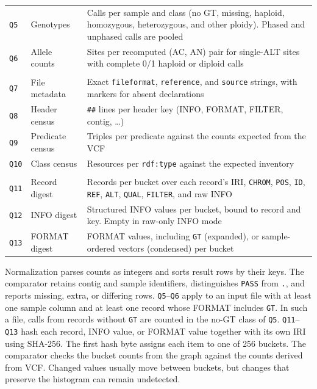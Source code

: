 \documentclass[11pt]{article}
\begin{document}
\begin{table}[!htbp]
\begin{tabularx}{\textwidth}{@{}l l >{\raggedright\arraybackslash}X@{}}
\texttt{Q5} & Genotypes & Calls per sample and class (no GT, missing, haploid, homozygous, heterozygous, and other ploidy).
Phased and unphased calls are pooled\\
\texttt{Q6} & Allele counts & Sites per recomputed (AC, AN) pair for single-ALT sites with complete 0/1 haploid or diploid calls\\
\addlinespace[3pt]
\multicolumn{3}{@{}l}{\textit{Metadata and graph structure}}\\
\texttt{Q7} & File metadata & Exact \texttt{fileformat}, \texttt{reference}, and \texttt{source} strings, with markers for absent declarations\\
\texttt{Q8} & Header census & \texttt{\#\#} lines per header key (INFO, FORMAT, FILTER, contig, \dots)\\
\texttt{Q9} & Predicate census & Triples per predicate against the counts expected from the VCF\\
\texttt{Q10} & Class census & Resources per \texttt{rdf:type} against the expected inventory\\
\addlinespace[3pt]
\multicolumn{3}{@{}l}{\textit{Value preservation: IRI-bound digests}}\\
\texttt{Q11} & Record digest & Records per bucket over each record's IRI, \texttt{CHROM}, \texttt{POS}, \texttt{ID}, \texttt{REF}, \texttt{ALT}, \texttt{QUAL}, \texttt{FILTER}, and raw INFO\\
\texttt{Q12} & INFO digest & Structured INFO values per bucket, bound to record and key.
Empty in raw-only INFO mode\\
\texttt{Q13} & FORMAT digest & FORMAT values, including \texttt{GT} (expanded), or sample-ordered vectors (condensed) per bucket\\
\bottomrule
\end{tabularx}
\end{table}

Normalization parses counts as integers and sorts result rows by their keys.
The comparator retains contig and sample identifiers, distinguishes \texttt{PASS} from \texttt{.}, and reports missing, extra, or differing rows.
\texttt{Q5}--\texttt{Q6} apply to an input file with at least one sample column and at least one record whose FORMAT includes \texttt{GT}.
In such a file, calls from records without \texttt{GT} are counted in the no-GT class of \texttt{Q5}.
\texttt{Q11}--\texttt{Q13} hash each record, INFO value, or FORMAT value together with its own IRI using SHA-256.
The first hash byte assigns each item to one of 256 buckets.
The comparator checks the bucket counts from the graph against the counts derived from VCF.
Changed values usually move between buckets, but changes that preserve the histogram can remain undetected.
\end{document}
